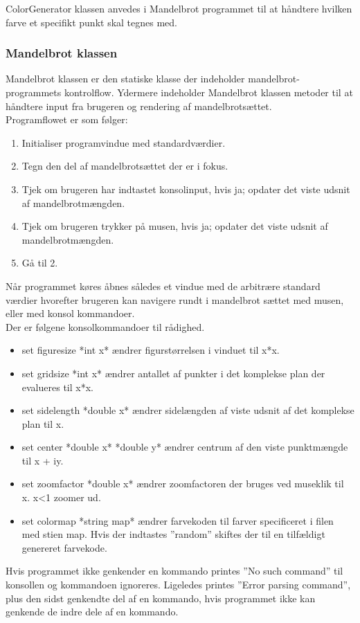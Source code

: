 ColorGenerator klassen anvedes i Mandelbrot programmet til at håndtere hvilken farve et specifikt punkt skal tegnes med.

\subsubsection{Mandelbrot klassen}
Mandelbrot klassen er den statiske klasse der indeholder mandelbrot-programmets kontrolflow. Ydermere indeholder Mandelbrot klassen metoder til at håndtere input fra brugeren og rendering af mandelbrotsættet. \\

Programflowet er som følger:
\begin{enumerate}
    \item Initialiser programvindue med standardværdier.
    \item Tegn den del af mandelbrotsættet der er i fokus.
    \item Tjek om brugeren har indtastet konsolinput, hvis ja; opdater det viste udsnit af mandelbrotmængden.
    \item Tjek om brugeren trykker på musen, hvis ja; opdater det viste udsnit af mandelbrotmængden.
    \item Gå til 2.
\end{enumerate}

Når programmet køres åbnes således et vindue med de arbitrære standard værdier hvorefter brugeren kan navigere rundt i mandelbrot sættet med musen, eller med konsol kommandoer. \\
Der er følgene konsolkommandoer til rådighed.
\begin{itemize}
    \item set figuresize *int x* ændrer figurstørrelsen i vinduet til x*x.
    \item set gridsize *int x* ændrer antallet af punkter i det komplekse plan der evalueres til x*x.
    \item set sidelength *double x* ændrer sidelængden af viste udsnit af det komplekse plan til x.
    \item set center *double x* *double y* ændrer centrum af den viste punktmængde til x + iy.
    \item set zoomfactor *double x* ændrer zoomfactoren der bruges ved museklik til x. x<1 zoomer ud.
    \item set colormap *string map* ændrer farvekoden til farver specificeret i filen med stien map. Hvis der indtastes ''random'' skiftes der til en tilfældigt genereret farvekode.
\end{itemize}
Hvis programmet ikke genkender en kommando printes ''No such command'' til konsollen og kommandoen ignoreres. Ligeledes printes ''Error parsing command'', plus den sidst genkendte del af en kommando,  hvis programmet ikke kan genkende de indre dele af en kommando.\\

